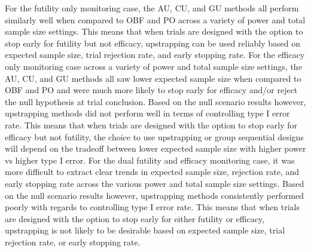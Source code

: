 \documentclass[Afour,sageh,times,square,numbers]{sagej}
\begin{document}
For the futility only monitoring case, the AU, CU, and GU methods all perform similarly well when compared to OBF and PO across a variety of power and total sample size settings.  This means that when trials are designed with the option to stop early for futility but not efficacy, upstrapping can be used reliably based on expected sample size, trial rejection rate, and early stopping rate.  For the efficacy only monitoring case across a variety of power and total sample size settings, the AU, CU, and GU methods all saw lower expected sample size when compared to OBF and PO and were much more likely to stop early for efficacy and/or reject the null hypothesis at trial conclusion.  Based on the null scenario results however, upstrapping methods did not perform well in terms of controlling type I error rate.  This means that when trials are designed with the option to stop early for efficacy but not futility, the choice to use upstrapping or group sequential designs will depend on the tradeoff between lower expected sample size with higher power vs higher type I error.  For the dual futility and efficacy monitoring case, it was more difficult to extract clear trends in expected sample size, rejection rate, and early stopping rate across the various power and total sample size settings.  Based on the null scenario results however, upstrapping methods consistently performed poorly with regards to controlling type I error rate.  This means that when trials are designed with the option to stop early for either futility or efficacy, upstrapping is not likely to be desirable based on expected sample size, trial rejection rate, or early stopping rate.
\end{document}

